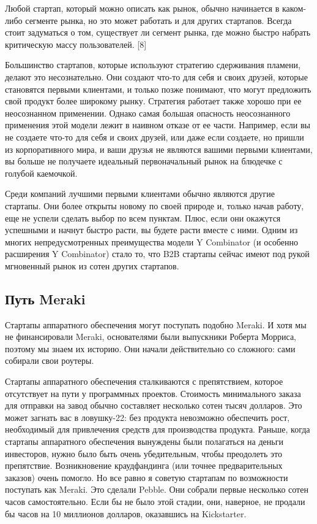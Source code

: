 \documentclass[ebook,12pt,oneside,openany]{memoir}
\begin{document}
Любой стартап, который можно описать как рынок, обычно начинается в
каком-либо сегменте рынка, но это может работать и для других
стартапов. Всегда стоит задуматься о том, существует ли сегмент рынка,
где можно быстро набрать критическую массу пользователей. [8] \newline

Большинство стартапов, которые используют стратегию сдерживания
пламени, делают это несознательно. Они создают что-то для себя и своих
друзей, которые становятся первыми клиентами, и только позже понимают,
что могут предложить свой продукт более широкому рынку. Стратегия
работает также хорошо при ее неосознанном применении. Однако самая
большая опасность неосознанного применения этой модели лежит в наивном
отказе от ее части. Например, если вы не создаете что-то для себя и
своих друзей, или даже если создаете, но пришли из корпоративного
мира, и ваши друзья не являются вашими первыми клиентами, вы больше не
получаете идеальный первоначальный рынок на блюдечке с голубой
каемочкой. \newline

Среди компаний лучшими первыми клиентами обычно являются другие
стартапы. Они более открыты новому по своей природе и, только начав
работу, еще не успели сделать выбор по всем пунктам. Плюс, если они
окажутся успешными и начнут быстро расти, вы будете расти вместе с
ними. Одним из многих непредусмотренных преимущества модели Y
Combinator (и особенно расширения Y Combinator) стало то, что B2B
стартапы сейчас имеют под рукой мгновенный рынок из сотен других
стартапов. \newline

\subsection{Путь Meraki}

Стартапы аппаратного обеспечения могут поступать подобно Meraki. И
хотя мы не финансировали Meraki, основателями были выпускники Роберта
Морриса, поэтому мы знаем их историю. Они начали действительно со
сложного: сами собирали свои роутеры. \newline

Стартапы аппаратного обеспечения сталкиваются с препятствием, которое
отсутствует на пути у программных проектов. Стоимость минимального
заказа для отправки на завод обычно составляет несколько сотен тысяч
долларов. Это может загнать вас в ловушку-22: без продукта невозможно
обеспечить рост, необходимый для привлечения средств для производства
продукта. Раньше, когда стартапы аппаратного обеспечения вынуждены
были полагаться на деньги инвесторов, нужно было быть очень
убедительным, чтобы преодолеть это препятствие. Возникновение
краудфандинга (или точнее предварительных заказов) очень помогло. Но
все равно я советую стартапам по возможности поступать как Meraki. Это
сделали Pebble. Они собрали первые несколько сотен часов
самостоятельно. Если бы не было этой стадии, они, наверное, не продали
бы часов на 10 миллионов долларов, оказавшись на Kickstarter. \newline
\end{document}
